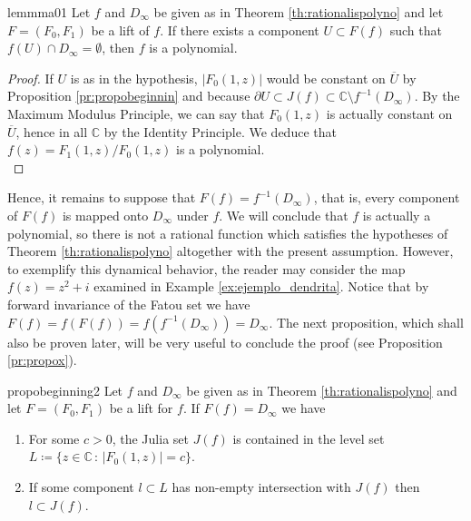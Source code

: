 \begin{mylema}{}{lemmma01}
Let $f$ and $D_\infty$ be given as in Theorem \ref{th:rationalispolyno} and let $F = (F_0,F_1)$ be a lift of $f$. If there exists a component $U\subset F(f)$ such that $f(U)\cap D_\infty=\emptyset$, then $f$ is a polynomial.
\end{mylema}
\begin{proof}
If $U$ is as in the hypothesis, $|F_0(1,z)|$ would be constant on $\overline{U}$ by Proposition \ref{pr:propobeginnin} and because $\partial U \subset J(f) \subset \mathbb{C}\setminus f^{-1}(D_\infty)$. By the Maximum Modulus Principle, we can say that $F_0(1,z)$ is actually constant on $\overline{U}$, hence in all $\mathbb{C}$ by the Identity Principle. We deduce that $f(z) = F_1(1,z)/F_0(1,z)$ is a polynomial.\\
\end{proof}

Hence, it remains to suppose that $F(f) = f^{-1}(D_\infty)$, that is, every component of $F(f)$ is mapped onto $D_\infty$ under $f$. We will conclude that $f$ is actually a polynomial, so there is not a rational function which satisfies the hypotheses of Theorem \ref{th:rationalispolyno} altogether with the present assumption. However, to exemplify this dynamical behavior, the reader may consider the map $f(z) = z^2+i$ examined in Example \ref{ex:ejemplo_dendrita}. Notice that by forward invariance of the Fatou set we have $F(f)=f(F(f))=f(f^{-1}(D_\infty))=D_\infty$. The next proposition, which shall also be proven later, will be very useful to conclude the proof (see Proposition \ref{pr:propox}).\\

\begin{myprop}{}{propobeginning2}
Let $f$ and $D_\infty$ be given as in Theorem \ref{th:rationalispolyno} and let $F = (F_0,F_1)$ be a lift for $f$. If $F(f) = D_\infty$ we have 
\begin{enumerate}
\item For some $c>0$, the Julia set $J(f)$ is contained in the level set $L\coloneqq \{z\in \mathbb{C}\,:\, |F_0(1,z)| = c\}$.\\
\item If some component $l\subset L$ has non-empty intersection with $J(f)$ then $l\subset J(f)$.
\end{enumerate}
\end{myprop}


